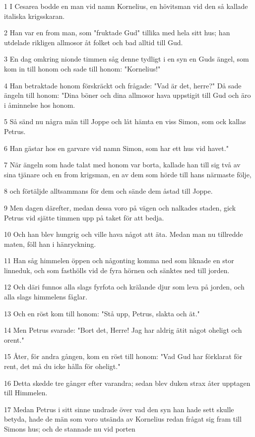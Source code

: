\par 1 I Cesarea bodde en man vid namn Kornelius, en hövitsman vid den så kallade italiska krigsskaran.
\par 2 Han var en from man, som "fruktade Gud" tillika med hela sitt hus; han utdelade rikligen allmosor åt folket och bad alltid till Gud.
\par 3 En dag omkring nionde timmen såg denne tydligt i en syn en Guds ängel, som kom in till honom och sade till honom: "Kornelius!"
\par 4 Han betraktade honom förskräckt och frågade: "Vad är det, herre?" Då sade ängeln till honom: "Dina böner och dina allmosor hava uppstigit till Gud och äro i åminnelse hos honom.
\par 5 Så sänd nu några män till Joppe och låt hämta en viss Simon, som ock kallas Petrus.
\par 6 Han gästar hos en garvare vid namn Simon, som har ett hus vid havet."
\par 7 När ängeln som hade talat med honom var borta, kallade han till sig två av sina tjänare och en from krigsman, en av dem som hörde till hans närmaste följe,
\par 8 och förtäljde alltsammans för dem och sände dem åstad till Joppe.
\par 9 Men dagen därefter, medan dessa voro på vägen och nalkades staden, gick Petrus vid sjätte timmen upp på taket för att bedja.
\par 10 Och han blev hungrig och ville hava något att äta. Medan man nu tillredde maten, föll han i hänryckning.
\par 11 Han såg himmelen öppen och någonting komma ned som liknade en stor linneduk, och som fasthölls vid de fyra hörnen och sänktes ned till jorden.
\par 12 Och däri funnos alla slags fyrfota och krälande djur som leva på jorden, och alla slags himmelens fåglar.
\par 13 Och en röst kom till honom: "Stå upp, Petrus, slakta och ät."
\par 14 Men Petrus svarade: "Bort det, Herre! Jag har aldrig ätit något oheligt och orent."
\par 15 Åter, för andra gången, kom en röst till honom: "Vad Gud har förklarat för rent, det må du icke hålla för oheligt."
\par 16 Detta skedde tre gånger efter varandra; sedan blev duken strax åter upptagen till Himmelen.
\par 17 Medan Petrus i sitt sinne undrade över vad den syn han hade sett skulle betyda, hade de män som voro utsända av Kornelius redan frågat sig fram till Simons hus; och de stannade nu vid porten
